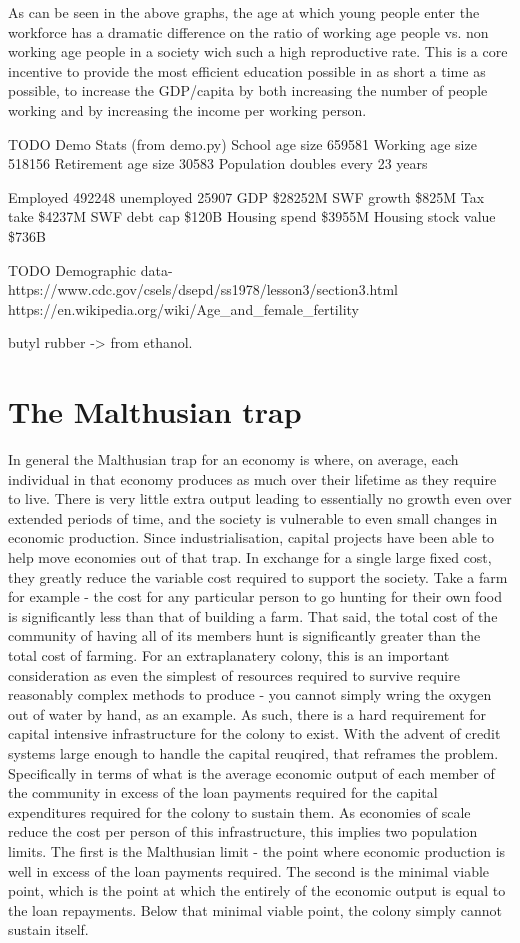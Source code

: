 \documentclass[10pt]{article}
\begin{document}
As can be seen in the above graphs, the age at which young people enter the workforce has a dramatic difference on the ratio of working age people vs. non working age people in a society wich such a high reproductive rate. This is a core incentive to provide the most efficient education possible in as short a time as possible, to increase the GDP/capita by both increasing the number of people working and by increasing the income per working person.


TODO Demo Stats (from demo.py)
School age size 659581
Working age size 518156
Retirement age size 30583
Population doubles every 23 years

Employed 492248 unemployed 25907
GDP \$28252M
SWF growth \$825M
Tax take \$4237M
SWF debt cap \$120B
Housing spend \$3955M
Housing stock value \$736B

TODO Demographic data-
https://www.cdc.gov/csels/dsepd/ss1978/lesson3/section3.html
https://en.wikipedia.org/wiki/Age_and_female_fertility




butyl rubber -> from ethanol.


\section{The Malthusian trap}
In general the Malthusian trap for an economy is where, on average, each individual in that economy produces as much over their lifetime as they require to live. There is very little extra output leading to essentially no growth even over extended periods of time, and the society is vulnerable to even small changes in economic production. Since industrialisation, capital projects have been able to help move economies out of that trap. In exchange for a single large fixed cost, they greatly reduce the variable cost required to support the society. Take a farm for example - the cost for any particular person to go hunting for their own food is significantly less than that of building a farm. That said, the total cost of the community of having all of its members hunt is significantly greater than the total cost of farming. For an extraplanatery colony, this is an important consideration as even the simplest of resources required to survive require reasonably complex methods to produce - you cannot simply wring the oxygen out of water by hand, as an example. As such, there is a hard requirement for capital intensive infrastructure for the colony to exist. With the advent of credit systems large enough to handle the capital reuqired, that reframes the problem. Specifically in terms of what is the average economic output of each member of the community in excess of the loan payments required for the capital expenditures required for the colony to sustain them. As economies of scale reduce the cost per person of this infrastructure, this implies two population limits. The first is the Malthusian limit - the point where economic production is well in excess of the loan payments required. The second is the minimal viable point, which is the point at which the entirely of the economic output is equal to the loan repayments. Below that minimal viable point, the colony simply cannot sustain itself.
\end{document}
